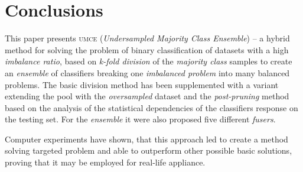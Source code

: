 \documentclass[pmlr]{jmlr}
\begin{document}
\section{Conclusions}
\label{sec:intro}

This paper presents \textsc{umce} (\emph{Undersampled Majority Class Ensemble}) -- a hybrid method for solving the problem of binary classification of datasets with a high \emph{imbalance ratio}, based on \emph{k-fold division} of the \emph{majority class} samples to create an \emph{ensemble} of classifiers breaking one \emph{imbalanced problem} into many balanced problems. The basic division method has been supplemented with a variant extending the pool with the \emph{oversampled} dataset and the \emph{post-pruning} method based on the analysis of the statistical dependencies of the classifiers response on the testing set. For the \emph{ensemble} it were also proposed five different \emph{fusers}.

Computer experiments have shown, that this approach led to create a method solving targeted problem and able to outperform other possible basic solutions, proving that it may be employed for real-life appliance.


\end{document}
